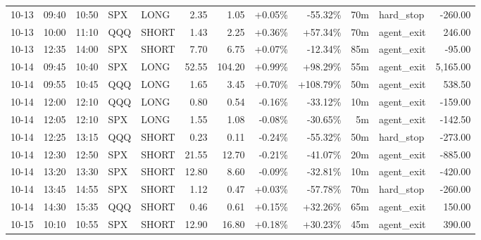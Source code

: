 \documentclass[11pt,a4paper,twoside]{article}
\begin{document}
\begin{center}
\begin{longtable}{>{\color{txtmain}}l l l l l r r r r r >{\color{txtmain}}l r}
10-13 & 09:40 & 10:50 & SPX & LONG & 2.35 & 1.05 & \textcolor{wingreen}{+0.05\%} & \textcolor{lossred}{-55.32\%} & 70m & hard\_stop & \textcolor{lossred}{-260.00} \\
10-13 & 10:00 & 11:10 & QQQ & SHORT & 1.43 & 2.25 & \textcolor{wingreen}{+0.36\%} & \textcolor{wingreen}{+57.34\%} & 70m & agent\_exit & \textcolor{wingreen}{246.00} \\
10-13 & 12:35 & 14:00 & SPX & SHORT & 7.70 & 6.75 & \textcolor{wingreen}{+0.07\%} & \textcolor{lossred}{-12.34\%} & 85m & agent\_exit & \textcolor{lossred}{-95.00} \\
10-14 & 09:45 & 10:40 & SPX & LONG & 52.55 & 104.20 & \textcolor{wingreen}{+0.99\%} & \textcolor{wingreen}{+98.29\%} & 55m & agent\_exit & \textcolor{wingreen}{5,165.00} \\
10-14 & 09:55 & 10:45 & QQQ & LONG & 1.65 & 3.45 & \textcolor{wingreen}{+0.70\%} & \textcolor{wingreen}{+108.79\%} & 50m & agent\_exit & \textcolor{wingreen}{538.50} \\
10-14 & 12:00 & 12:10 & QQQ & LONG & 0.80 & 0.54 & \textcolor{lossred}{-0.16\%} & \textcolor{lossred}{-33.12\%} & 10m & agent\_exit & \textcolor{lossred}{-159.00} \\
10-14 & 12:05 & 12:10 & SPX & LONG & 1.55 & 1.08 & \textcolor{lossred}{-0.08\%} & \textcolor{lossred}{-30.65\%} & 5m & agent\_exit & \textcolor{lossred}{-142.50} \\
10-14 & 12:25 & 13:15 & QQQ & SHORT & 0.23 & 0.11 & \textcolor{lossred}{-0.24\%} & \textcolor{lossred}{-55.32\%} & 50m & hard\_stop & \textcolor{lossred}{-273.00} \\
10-14 & 12:30 & 12:50 & SPX & SHORT & 21.55 & 12.70 & \textcolor{lossred}{-0.21\%} & \textcolor{lossred}{-41.07\%} & 20m & agent\_exit & \textcolor{lossred}{-885.00} \\
10-14 & 13:20 & 13:30 & SPX & SHORT & 12.80 & 8.60 & \textcolor{lossred}{-0.09\%} & \textcolor{lossred}{-32.81\%} & 10m & agent\_exit & \textcolor{lossred}{-420.00} \\
10-14 & 13:45 & 14:55 & SPX & SHORT & 1.12 & 0.47 & \textcolor{wingreen}{+0.03\%} & \textcolor{lossred}{-57.78\%} & 70m & hard\_stop & \textcolor{lossred}{-260.00} \\
10-14 & 14:30 & 15:35 & QQQ & SHORT & 0.46 & 0.61 & \textcolor{wingreen}{+0.15\%} & \textcolor{wingreen}{+32.26\%} & 65m & agent\_exit & \textcolor{wingreen}{150.00} \\
10-15 & 10:10 & 10:55 & SPX & SHORT & 12.90 & 16.80 & \textcolor{wingreen}{+0.18\%} & \textcolor{wingreen}{+30.23\%} & 45m & agent\_exit & \textcolor{wingreen}{390.00} \\

\end{longtable}
\end{center}
\end{document}
